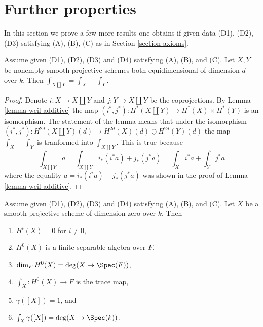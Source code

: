 \section{Further properties}
\label{section-further}

\noindent
In this section we prove a few more results one obtains if
given data (D1), (D2), (D3) satisfying (A), (B), (C) as in
Section \ref{section-axioms}.

\begin{lemma}
\label{lemma-trace-disjoint-union}
Assume given (D1), (D2), (D3) and (D4) satisfying (A), (B), and (C).
Let $X, Y$ be nonempty smooth projective schemes both equidimensional
of dimension $d$ over $k$. Then $\int_{X \amalg Y} = \int_X + \int_Y$.
\end{lemma}

\begin{proof}
Denote $i : X \to X \amalg Y$ and $j : Y \to X \amalg Y$ be the coprojections.
By Lemma \ref{lemma-weil-additive} the map
$(i^*, j^*) : H^*(X \amalg Y) \to H^*(X) \times H^*(Y)$ is an isomorphism.
The statement of the lemma means that under the isomorphism
$(i^*, j^*) : H^{2d}(X \amalg Y)(d) \to H^{2d}(X)(d) \oplus H^{2d}(Y)(d)$
the map $\int_X + \int_Y$ is tranformed into $\int_{X \amalg Y}$.
This is true because
$$
\int_{X \amalg Y} a =
\int_{X \amalg Y} i_*(i^*a) + j_*(j^*a) =
\int_X i^*a + \int_Y j^*a
$$
where the equality $a = i_*(i^*a) + j_*(j^*a)$ was shown in
the proof of Lemma \ref{lemma-weil-additive}.
\end{proof}

\begin{lemma}
\label{lemma-dim-0}
Assume given (D1), (D2), (D3) and (D4) satisfying (A), (B), and (C).
Let $X$ be a smooth projective scheme of dimension zero over $k$.
Then
\begin{enumerate}
\item $H^i(X) = 0$ for $i \not = 0$,
\item $H^0(X)$ is a finite separable algebra over $F$,
\item $\dim_F H^0(X) = \deg(X \to \Spec(F))$,
\item $\int_X : H^0(X) \to F$ is the trace map,
\item $\gamma([X]) = 1$, and
\item $\int_X \gamma([X]) = \deg(X \to \Spec(k))$.
\end{enumerate}
\end{lemma}

